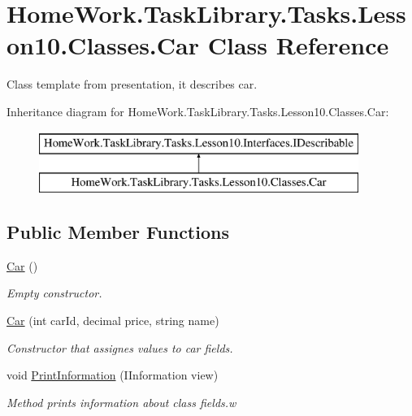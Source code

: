 \hypertarget{class_home_work_1_1_task_library_1_1_tasks_1_1_lesson10_1_1_classes_1_1_car}{}\section{Home\+Work.\+Task\+Library.\+Tasks.\+Lesson10.\+Classes.\+Car Class Reference}
\label{class_home_work_1_1_task_library_1_1_tasks_1_1_lesson10_1_1_classes_1_1_car}


Class template from presentation, it describes car.  


Inheritance diagram for Home\+Work.\+Task\+Library.\+Tasks.\+Lesson10.\+Classes.\+Car\+:\begin{figure}[H]
\begin{center}
\leavevmode
\includegraphics[height=2.000000cm]{class_home_work_1_1_task_library_1_1_tasks_1_1_lesson10_1_1_classes_1_1_car}
\end{center}
\end{figure}
\subsection*{Public Member Functions}
\begin{DoxyCompactItemize}
\item 
\mbox{\hyperlink{class_home_work_1_1_task_library_1_1_tasks_1_1_lesson10_1_1_classes_1_1_car_ad8181b0934f020d1d961d32571a90966}{Car}} ()
\begin{DoxyCompactList}\small\item\em Empty constructor. \end{DoxyCompactList}\item 
\mbox{\hyperlink{class_home_work_1_1_task_library_1_1_tasks_1_1_lesson10_1_1_classes_1_1_car_aefa9e1208928d686db42ee5cdb75e6ea}{Car}} (int car\+Id, decimal price, string name)
\begin{DoxyCompactList}\small\item\em Constructor that assignes values to car fields. \end{DoxyCompactList}\item 
void \mbox{\hyperlink{class_home_work_1_1_task_library_1_1_tasks_1_1_lesson10_1_1_classes_1_1_car_a424f8501c10c78f9bfd27bd4c45dca96}{Print\+Information}} (I\+Information view)
\begin{DoxyCompactList}\small\item\em Method prints information about class fields.\+w \end{DoxyCompactList}\end{DoxyCompactItemize}
